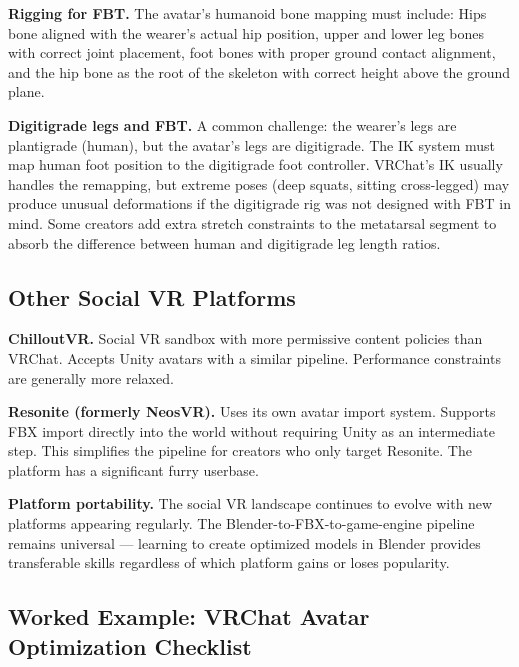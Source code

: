 \textbf{Rigging for FBT.} The avatar's humanoid bone mapping must include: Hips bone aligned with the wearer's actual hip position, upper and lower leg bones with correct joint placement, foot bones with proper ground contact alignment, and the hip bone as the root of the skeleton with correct height above the ground plane.

\begin{furrybox}
\textbf{Digitigrade legs and FBT.} A common challenge: the wearer's legs are plantigrade (human), but the avatar's legs are digitigrade. The IK system must map human foot position to the digitigrade foot controller. VRChat's IK usually handles the remapping, but extreme poses (deep squats, sitting cross-legged) may produce unusual deformations if the digitigrade rig was not designed with FBT in mind. Some creators add extra stretch constraints to the metatarsal segment to absorb the difference between human and digitigrade leg length ratios.
\end{furrybox}


\subsection{Other Social VR Platforms}

\textbf{ChilloutVR.} Social VR sandbox with more permissive content policies than VRChat. Accepts Unity avatars with a similar pipeline. Performance constraints are generally more relaxed.

\textbf{Resonite (formerly NeosVR).} Uses its own avatar import system. Supports FBX import directly into the world without requiring Unity as an intermediate step. This simplifies the pipeline for creators who only target Resonite. The platform has a significant furry userbase.

\textbf{Platform portability.} The social VR landscape continues to evolve with new platforms appearing regularly. The Blender-to-FBX-to-game-engine pipeline remains universal --- learning to create optimized models in Blender provides transferable skills regardless of which platform gains or loses popularity.



\subsection{Worked Example: VRChat Avatar Optimization Checklist}
\label{subsec:worked-vrchat-checklist}

